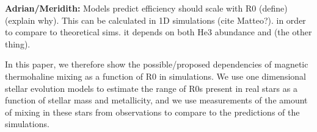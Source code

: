 \textbf{Adrian/Meridith:} Models predict efficiency should scale with R0 (define) (explain why). This can be calculated in 1D simulations (cite Matteo?). in order to compare to theoretical sims. it depends on both He3 abundance and (the other thing). 

In this paper, we therefore show the possible/proposed dependencies of magnetic thermohaline mixing as a function of R0 in simulations. We use one dimensional stellar evolution models to estimate the range of R0s present in real stars as a function of stellar mass and metallicity, and we use measurements of the amount of mixing in these stars from observations to compare to the predictions of the simulations. 